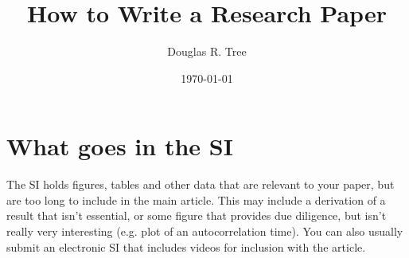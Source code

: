 \documentclass[journal=mamobx,manuscript=suppinfo]{achemso}
\title{How to Write a Research Paper}
\author{Douglas R. Tree}
\affiliation{Chemical Engineering Department, Brigham Young University, Provo, Utah}
\date{\today}
\begin{document}
\maketitle

\section{What goes in the SI}
The SI holds figures, tables and other data that are relevant to your paper, but are too long to include in the main article.
This may include a derivation of a result that isn't essential, or some figure that provides due diligence, but isn't really very interesting (e.g. plot of an autocorrelation time).
You can also usually submit an electronic SI that includes videos for inclusion with the article.

%
\end{document}
